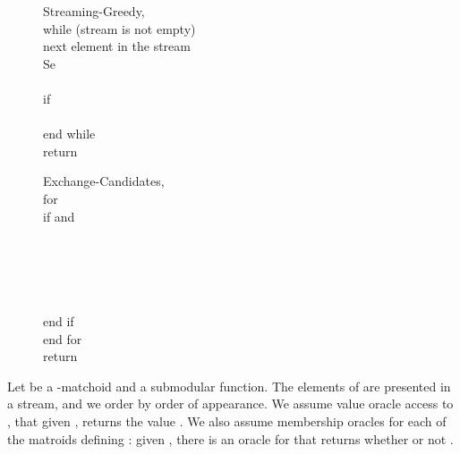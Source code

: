 \documentclass[oneside,letterpaper]{scrartcl} \usepackage{macros}
\begin{document}
\begin{figure}[t]
  \centering
  \begin{minipage}{6.9cm}
    \begin{framed}
      \begin{pseudocode}
        \begin{routine}{Streaming-Greedy}{,}
          \\
          while (stream is not empty) \+\\
           next element in the stream\\
          Se \\\\
          if  \\
          \>  \\
          \< end while \- \\
          return 
        \end{routine} \end{pseudocode}
      \vspace{.2ex}
    \end{framed}
  \end{minipage}
  \qquad
  \begin{minipage}{6.4cm}
    \begin{framed}
      \begin{pseudocode}
        \begin{routine}{Exchange-Candidates}{,}
          \\
          for  \\
          \> if  and \\
          \> \> \\
          \> \> \\
          \> \> \\
          \> \> \\
          \> \>  \\
          \> end if \\
          end for\\
          return 
        \end{routine}
      \end{pseudocode}
    \end{framed}
  \end{minipage}
\end{figure}



Let  be a -matchoid and  a submodular
function. The elements of  are presented in a stream, and
we order  by order of appearance. We assume value oracle
access to , that given , returns the value
. We also assume membership oracles for each of the 
matroids defining : given , there
is an oracle for  that returns whether or not .
\end{document}

